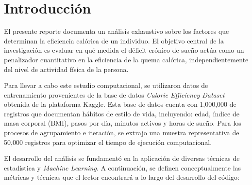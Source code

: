 \documentclass{article}
\begin{document}


\section{Introducción}

El presente reporte documenta un análisis exhaustivo sobre los factores que determinan la eficiencia calórica de un individuo. El objetivo central de la investigación es evaluar en qué medida el déficit crónico de sueño actúa como un penalizador cuantitativo en la eficiencia de la quema calórica, independientemente del nivel de actividad física de la persona.

Para llevar a cabo este estudio computacional, se utilizaron datos de entrenamiento provenientes de la base de datos \textit{Calorie Efficiency Dataset} obtenida de la plataforma Kaggle. Esta base de datos cuenta con 1,000,000 de registros que documentan hábitos de estilo de vida, incluyendo: edad, índice de masa corporal (BMI), pasos por día, minutos activos y horas de sueño. Para los procesos de agrupamiento e iteración, se extrajo una muestra representativa de 50,000 registros para optimizar el tiempo de ejecución computacional.

El desarrollo del análisis se fundamentó en la aplicación de diversas técnicas de estadística y \textit{Machine Learning}. A continuación, se definen conceptualmente las métricas y técnicas que el lector encontrará a lo largo del desarrollo del código:
\end{document}
